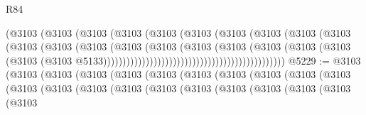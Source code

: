 \begin{lexlean}{R84}
\begin{coremodule}
                                                      (@3103
                                                        (@3103
                                                          (@3103
                                                            (@3103
                                                              (@3103
                                                                (@3103
                                                                  (@3103
                                                                    (@3103
                                                                      (@3103
                                                                        (@3103
                                                                          (@3103
                                                                            (@3103
                                                                              (@3103
                                                                                (@3103
                                                                                  (@3103
                                                                                    (@3103
                                                                                      (@3103
                                                                                        (@3103
                                                                                          (@3103
                                                                                            (@3103
                                                                                              (@3103
                                                                                                (@3103
                                                                                                  @5133)))))))))))))))))))))))))))))))))))))))))))))))
@5229 := @3103
    (@3103
      (@3103
        (@3103
          (@3103
            (@3103
              (@3103
                (@3103
                  (@3103
                    (@3103
                      (@3103
                        (@3103
                          (@3103
                            (@3103
                              (@3103
                                (@3103
                                  (@3103
                                    (@3103
                                      (@3103
                                        (@3103
                                          (@3103
                                            (@3103

\end{coremodule}
\end{lexlean}
